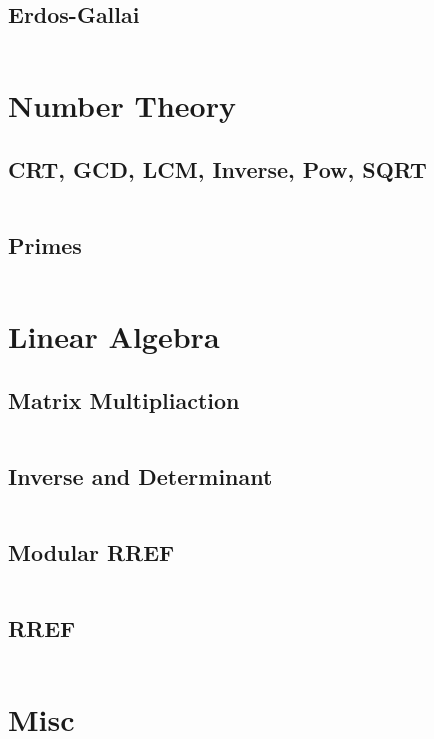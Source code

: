 \documentclass[letterpaper,landscape]{article}
\begin{document}
\begin{multicols*}{2}
  \subsection{Erdos-Gallai}
  \inputminted{cpp}{src/Graphs/ErdosGallai.cpp}
  
  \section{Number Theory}
  
  \subsection{CRT, GCD, LCM, Inverse, Pow, SQRT}
  \inputminted{java}{src/Number_Theory/NumberTheory.java}
  
  \subsection{Primes}
  \inputminted{java}{src/Number_Theory/Prime.java}
  
  
  \section{Linear Algebra}
  
  \subsection{Matrix Multipliaction}
  \inputminted{cpp}{src/LinAlg/MatMultiply.cpp}
    
  \subsection{Inverse and Determinant}
  \inputminted{cpp}{src/LinAlg/GaussJordan.cpp}
  
  \subsection{Modular RREF}
  \inputminted{cpp}{src/LinAlg/ModularRREF.cpp}
  
  \subsection{RREF}
  \inputminted{cpp}{src/LinAlg/RREF.cpp}
  
  
  \section{Misc}

\end{multicols*}
\end{document}
